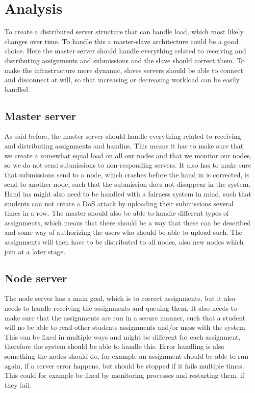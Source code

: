 \section{Analysis}
To create a distributed server structure that can handle load, which most
likely changes over time. To handle this a master-slave architecture could be
a good choice. Here the master server should handle everything related to
receiving and distributing assignments and submissions and the slave should
correct them. To make the infrastructure more dynamic, slaves servers should be
able to connect and disconnect at will, so that increasing or decreasing
workload can be easily handled.

\subsection{Master server}
As said before, the master server should handle everything related to receiving
and distributing assignments and handins. This means it has to make sure that we
create a somewhat equal load on all our nodes and that we monitor our nodes, so
we do not send submissions to non-responding servers. It also has to make sure
that submissions send to a node, which crashes before the hand in is corrected,
is send to another node, such that the submission does not disappear in the
system.
Hand ins might also need to be handled with a fairness system in mind, such that
students can not create a DoS attack by uploading their submissions several
times in a row.
The master should also be able to handle different types of assignments, which
means that there should be a way that these can be described and some way of
authorizing the users who should be able to upload such.
The assignments will then have to be distributed to all nodes, also new nodes
which join at a later stage.

\subsection{Node server}
The node server has a main goal, which is to correct assignments, but it also
needs to handle receiving the assignments and queuing them. It also needs to
make sure that the assignments are run in a secure manner, such that a student
will no be able to read other students assignments and/or mess with the system.
This can be fixed in multiple ways and might be different for each assignment,
therefore the system should be able to handle this.
Error handling is also something the nodes should do, for example an assignment
should be able to run again, if a server error happens, but should be stopped if
it fails multiple times. This could for example be fixed by monitoring processes
and restarting them, if they fail.

